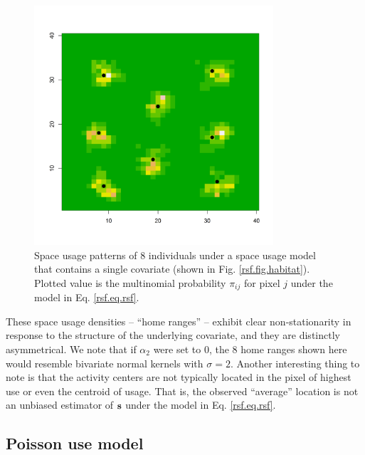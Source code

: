 \begin{figure}
\centering
\includegraphics[width=3.5in,height=3.5in]{Ch10-RSF/figs/homeranges8}
\caption{Space usage patterns of 8 individuals under a space usage
  model that contains a single covariate (shown in
  Fig. \ref{rsf.fig.habitat}). Plotted value is the multinomial
  probability $\pi_{ij}$ for pixel $j$ under the model in Eq. \ref{rsf.eq.rsf}.
}
\label{rsf.fig.homeranges}
\end{figure}
These space usage densities -- ``home ranges'' -- exhibit clear
non-stationarity in response to the structure of the underlying
covariate, and they are distinctly asymmetrical.  We note that if
$\alpha_{2}$ were set to 0, the 8 home ranges shown here would
resemble bivariate normal kernels with $\sigma = 2$.  Another
interesting thing to note is that the activity centers are not
typically located in the pixel of highest use or even the centroid of
usage. That is, the observed ``average'' location is not an unbiased
estimator of ${\bf s}$ under the model in Eq. \ref{rsf.eq.rsf}.


\subsection{Poisson use model}

